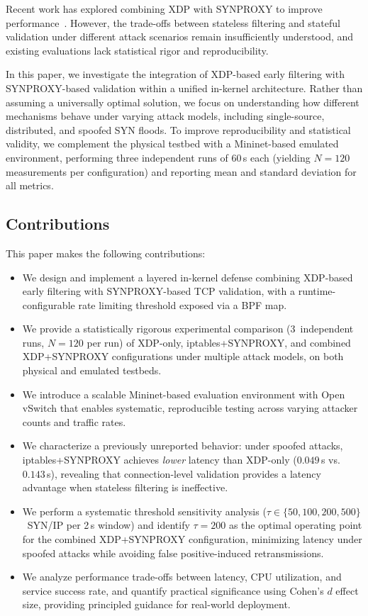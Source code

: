 \documentclass[conference]{IEEEtran}
\begin{document}
Recent work has explored combining XDP with SYNPROXY to improve
performance~\cite{NVidiaSynFlood}.
However, the trade-offs between stateless filtering and stateful validation
under different attack scenarios remain insufficiently understood, and
existing evaluations lack statistical rigor and reproducibility.

In this paper, we investigate the integration of XDP-based early filtering
with SYNPROXY-based validation within a unified in-kernel architecture.
Rather than assuming a universally optimal solution, we focus on
understanding how different mechanisms behave under varying attack models,
including single-source, distributed, and spoofed SYN floods.
To improve reproducibility and statistical validity, we complement the
physical testbed with a Mininet-based emulated environment, performing three
independent runs of 60\,s each (yielding $N=120$ measurements per
configuration) and reporting mean and standard deviation for all metrics.

\subsection*{Contributions}

This paper makes the following contributions:

\begin{itemize}
  \item We design and implement a layered in-kernel defense combining
        XDP-based early filtering with SYNPROXY-based TCP validation,
        with a runtime-configurable rate limiting threshold exposed via
        a BPF map.
  \item We provide a statistically rigorous experimental comparison
        (3~independent runs, $N=120$ per run) of XDP-only,
        iptables+SYNPROXY, and combined XDP+SYNPROXY configurations under
        multiple attack models, on both physical and emulated testbeds.
  \item We introduce a scalable Mininet-based evaluation environment with
        Open vSwitch that enables systematic, reproducible testing across
        varying attacker counts and traffic rates.
  \item We characterize a previously unreported behavior: under spoofed
        attacks, iptables+SYNPROXY achieves \emph{lower} latency than
        XDP-only ($0.049$\,s vs.\ $0.143$\,s), revealing that
        connection-level validation provides a latency advantage when
        stateless filtering is ineffective.
  \item We perform a systematic threshold sensitivity analysis
        ($\tau \in \{50,100,200,500\}$~SYN/IP per 2\,s window) and
        identify $\tau=200$ as the optimal operating point for the
        combined XDP+SYNPROXY configuration, minimizing latency under
        spoofed attacks while avoiding false positive-induced
        retransmissions.
  \item We analyze performance trade-offs between latency, CPU
        utilization, and service success rate, and quantify practical
        significance using Cohen's $d$ effect size, providing principled
        guidance for real-world deployment.
\end{itemize}
\end{document}
